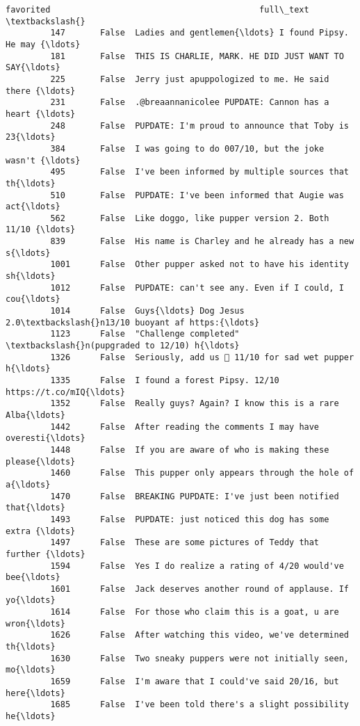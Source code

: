 \documentclass[11pt]{article}
\begin{document}
\begin{Verbatim}[commandchars=\\\{\}]
               favorited                                          full\_text  \textbackslash{}
         147       False  Ladies and gentlemen{\ldots} I found Pipsy. He may {\ldots}   
         181       False  THIS IS CHARLIE, MARK. HE DID JUST WANT TO SAY{\ldots}   
         225       False  Jerry just apuppologized to me. He said there {\ldots}   
         231       False  .@breaannanicolee PUPDATE: Cannon has a heart {\ldots}   
         248       False  PUPDATE: I'm proud to announce that Toby is 23{\ldots}   
         384       False  I was going to do 007/10, but the joke wasn't {\ldots}   
         495       False  I've been informed by multiple sources that th{\ldots}   
         510       False  PUPDATE: I've been informed that Augie was act{\ldots}   
         562       False  Like doggo, like pupper version 2. Both 11/10 {\ldots}   
         839       False  His name is Charley and he already has a new s{\ldots}   
         1001      False  Other pupper asked not to have his identity sh{\ldots}   
         1012      False  PUPDATE: can't see any. Even if I could, I cou{\ldots}   
         1014      False  Guys{\ldots} Dog Jesus 2.0\textbackslash{}n13/10 buoyant af https:{\ldots}   
         1123      False  "Challenge completed" \textbackslash{}n(pupgraded to 12/10) h{\ldots}   
         1326      False  Seriously, add us 🐶 11/10 for sad wet pupper h{\ldots}   
         1335      False  I found a forest Pipsy. 12/10 https://t.co/mIQ{\ldots}   
         1352      False  Really guys? Again? I know this is a rare Alba{\ldots}   
         1442      False  After reading the comments I may have overesti{\ldots}   
         1448      False  If you are aware of who is making these please{\ldots}   
         1460      False  This pupper only appears through the hole of a{\ldots}   
         1470      False  BREAKING PUPDATE: I've just been notified that{\ldots}   
         1493      False  PUPDATE: just noticed this dog has some extra {\ldots}   
         1497      False  These are some pictures of Teddy that further {\ldots}   
         1594      False  Yes I do realize a rating of 4/20 would've bee{\ldots}   
         1601      False  Jack deserves another round of applause. If yo{\ldots}   
         1614      False  For those who claim this is a goat, u are wron{\ldots}   
         1626      False  After watching this video, we've determined th{\ldots}   
         1630      False  Two sneaky puppers were not initially seen, mo{\ldots}   
         1659      False  I'm aware that I could've said 20/16, but here{\ldots}   
         1685      False  I've been told there's a slight possibility he{\ldots}   

\end{Verbatim}
\end{document}
